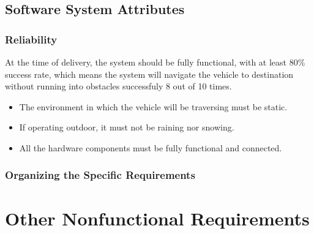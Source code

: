 \documentclass[compsoc,draftclsnofoot,onecolumn,10pt]{IEEEtran}
\begin{document}
\subsection{Software System Attributes}

\subsubsection{Reliability} %
At the time of delivery, the system should be fully functional, with at least 80\%
success rate, which means the system will navigate the vehicle to destination 
without running into obstacles successfuly 8 out of 10 times. 
\begin{itemize}
	\item The environment in which the vehicle will be traversing must be static.
	\item If operating outdoor, it must not be raining nor snowing.
	\item All the hardware components must be fully functional and connected. 
\end{itemize}

\subsubsection{Organizing the Specific Requirements}


\section{Other Nonfunctional Requirements}
\end{document}
